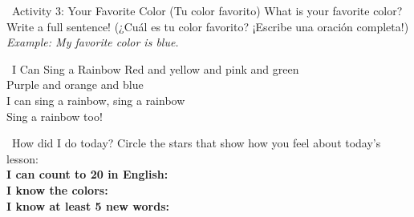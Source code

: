 \begin{activity}{ \ Activity 3: Your Favorite Color (Tu color favorito)}
  What is your favorite color? Write a full sentence! (¿Cuál es tu color favorito? ¡Escribe una oración completa!)\\
  \emph{Example: My favorite color is blue.}
  \writinglines[3]
\end{activity}

\begin{songbox}{ \ I Can Sing a Rainbow}
  Red and yellow and pink and green\\
  Purple and orange and blue\\
  I can sing a rainbow, sing a rainbow\\
  Sing a rainbow too!
\end{songbox}

\vspace{1em}
\begin{grammartip}{ \ How did I do today?}
  Circle the stars that show how you feel about today's lesson:\\[6pt]
  \textbf{I can count to 20 in English:} \selfcheck[0] \\[4pt]
  \textbf{I know the colors:} \selfcheck[0] \\[4pt]
  \textbf{I know at least 5 new words:} \selfcheck[0]
\end{grammartip}
